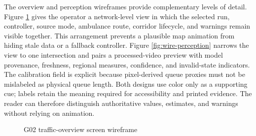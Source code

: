 The overview and perception wireframes provide complementary levels of detail. Figure \ref{fig:wire-overview} gives the operator a network-level view in which the selected run, controller, source mode, ambulance route, corridor lifecycle, and warnings remain visible together. This arrangement prevents a plausible map animation from hiding stale data or a fallback controller. Figure \ref{fig:wire-perception} narrows the view to one intersection and pairs a processed-video preview with model provenance, freshness, regional measures, confidence, and invalid-state indicators. The calibration field is explicit because pixel-derived queue proxies must not be mislabeled as physical queue length. Both designs use color only as a supporting cue; labels retain the meaning required for accessibility and printed evidence. The reader can therefore distinguish authoritative values, estimates, and warnings without relying on animation.

\begin{figure}[htbp]
\centering
{}
\caption{G02 traffic-overview screen wireframe}
\label{fig:wire-overview}
\end{figure}

